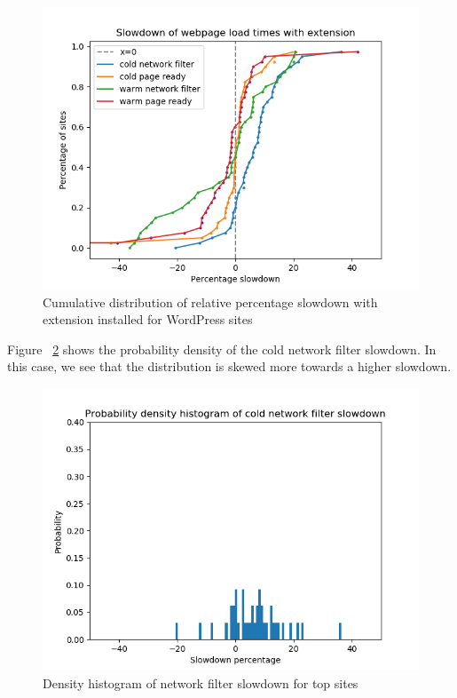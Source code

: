 \begin{figure}[h]
	\includegraphics[scale=0.5]{results/extension_slowdown_wordpress}
	\caption{Cumulative distribution of relative percentage slowdown with extension installed for WordPress sites}
	\label{fig:wordpress_slowdown}
\end{figure}

Figure ~\ref{fig:histogram_slowdown_wordpress} shows the probability density of the cold network filter slowdown. In this case, we see that the distribution is skewed more towards a higher slowdown.

\begin{figure}[h]
	\includegraphics[scale=0.5]{results/density_histogram_filter_slowdown_wordpress}
	\caption{Density histogram of network filter slowdown for top sites}
	\label{fig:histogram_slowdown_wordpress}
\end{figure}

